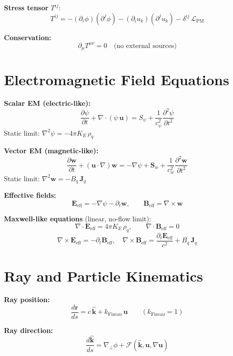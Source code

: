 \documentclass[10pt,twocolumn]{article}
\begin{document}
\textbf{Stress tensor} $T^{ij}$:
\[
  T^{ij} =
  -(\partial_i\phi)(\partial^j\phi)
  -(\partial_i u_k)(\partial^j u_k)
  - \delta^{ij}\,\mathcal{L}_{\mathrm{PM}}
\]

\textbf{Conservation:}
\[
  \partial_\mu T^{\mu\nu} = 0 \quad \text{(no external sources)}
\]

\section{Electromagnetic Field Equations}

\textbf{Scalar EM (electric-like):}
\[
  \frac{\partial\psi}{\partial t} + \nabla\cdot(\psi\,\mathbf u)
  = S_\psi + \frac{1}{c_\psi^2}\frac{\partial^2\psi}{\partial t^2}
\]
Static limit: $\nabla^2\psi = -4\pi K_E\,\rho_q$

\textbf{Vector EM (magnetic-like):}
\[
  \frac{\partial\mathbf w}{\partial t} + (\mathbf u\cdot\nabla)\mathbf w
  = -\nabla\psi + \mathbf S_w + \frac{1}{c_w^2}\frac{\partial^2\mathbf w}{\partial t^2}
\]
Static limit: $\nabla^2\mathbf w = -B_q\,\mathbf J_q$

\textbf{Effective fields:}
\[
  \mathbf E_{\mathrm{eff}} = -\nabla\psi - \partial_t\mathbf w, \qquad
  \mathbf B_{\mathrm{eff}} = \nabla\times\mathbf w
\]

\textbf{Maxwell-like equations} (linear, no-flow limit):
\[
  \nabla\cdot\mathbf E_{\mathrm{eff}} = 4\pi K_E\,\rho_q, \qquad
  \nabla\cdot\mathbf B_{\mathrm{eff}} = 0
\]
\[
  \nabla\times\mathbf E_{\mathrm{eff}} = -\partial_t\mathbf B_{\mathrm{eff}}, \quad
  \nabla\times\mathbf B_{\mathrm{eff}} = \frac{\partial_t\mathbf E_{\mathrm{eff}}}{c^2} + B_q\,\mathbf J_q
\]

\section{Ray and Particle Kinematics}

\textbf{Ray position:}
\[
  \frac{d\mathbf r}{ds} = c\,\hat{\mathbf k} + k_{\mathrm{Fizeau}}\,\mathbf u
  \qquad (k_{\mathrm{Fizeau}} = 1)
\]

\textbf{Ray direction:}
\[
  \frac{d\hat{\mathbf k}}{ds}
  = \nabla_\perp\phi + \mathcal{F}(\hat{\mathbf k},\mathbf u,\nabla\mathbf u)
\]
\end{document}
